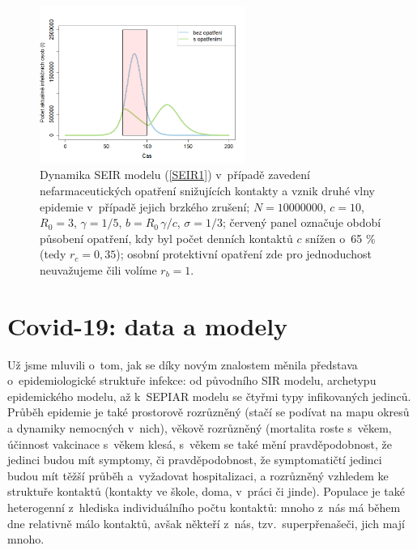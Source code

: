 \begin{figure}[ht]
	\begin{center}
			\includegraphics[width=0.6\textwidth]{pic/two_waves.png}
	\end{center}
	\caption{Dynamika SEIR modelu (\ref{SEIR1}) v~případě zavedení nefarmaceutických opatření snižujících kontakty a vznik druhé vlny epidemie v~případě jejich brzkého zrušení; $N=10000000$, $c=10$, $R_0=3$, $\gamma=1/5$, $b=R_0\,\gamma/c$, $\sigma=1/3$; červený panel označuje období působení opatření, kdy byl počet denních kontaktů $c$ snížen o~65 \% (tedy $r_c=0,35$); osobní protektivní opatření zde pro jednoduchost neuvažujeme čili volíme $r_b=1$. %
	}
	\label{SEIR-vlna}
\end{figure}

\section*{Covid-19: data a modely}

Už jsme mluvili o~tom, jak se díky novým znalostem měnila představa o~epidemiologické struktuře infekce: od původního SIR modelu, archetypu epidemického modelu, až k~SEPIAR modelu se čtyřmi typy infikovaných jedinců. Průběh epidemie je také prostorově rozrůzněný (stačí se podívat na mapu okresů a dynamiky nemocných v~nich), věkově rozrůzněný (mortalita roste s~věkem, účinnost vakcinace s~věkem klesá, s~věkem se také mění pravděpodobnost, že jedinci budou mít symptomy, či pravděpodobnost, že symptomatičtí jedinci budou mít těžší průběh a~vyžadovat hospitalizaci, a rozrůzněný vzhledem ke struktuře kontaktů (kontakty ve škole, doma, v~práci či jinde). Populace je také heterogenní z~hlediska individuálního počtu kontaktů: mnoho z~nás má během dne relativně málo kontaktů, avšak někteří z~nás, tzv.\ superpřenašeči, jich mají mnoho. 

